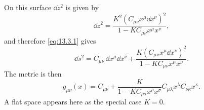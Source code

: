 

On this surface \(\dd z^2\) is given by
\[
  \dd z^2
  =
  \frac{K^2\left(C_{\mu\nu}x^\mu\dd x^\nu\right)^2}
       {1-KC_{\mu\nu}x^\mu x^\nu},
\]
and therefore \eqref{eq:13.3.1} gives
\begin{equation}
  \dd s^2
  =
  C_{\mu\nu}\,\dd x^\mu\dd x^\nu
  +
  \frac{K\left(C_{\mu\nu}x^\mu\dd x^\nu\right)^2}
       {1-KC_{\mu\nu}x^\mu x^\nu}.
  \tag{13.3.3}\label{eq:13.3.3}
\end{equation}
The metric is then
\begin{equation}
  g_{\mu\nu}(x)
  =
  C_{\mu\nu}
  +
  \frac{K}
       {1-KC_{\rho\sigma}x^\rho x^\sigma}
  C_{\mu\lambda}x^\lambda C_{\nu\kappa}x^\kappa.
  \tag{13.3.4}\label{eq:13.3.4}
\end{equation}
A flat space appears here as the special case \(K=0\).


